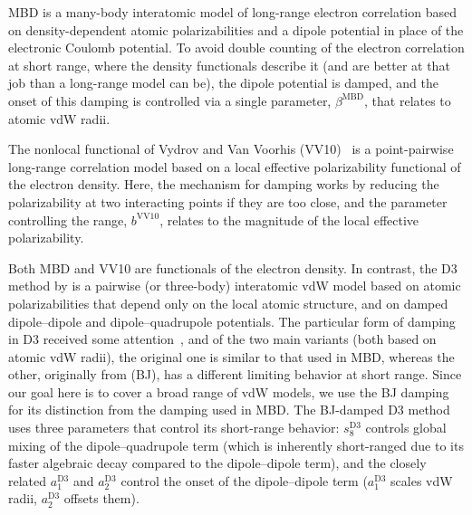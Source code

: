 MBD is a many-body interatomic model of long-range electron correlation based on density-dependent atomic polarizabilities and a dipole potential in place of the electronic Coulomb potential.
To avoid double counting of the electron correlation at short range, where the density functionals describe it (and are better at that job than a long-range model can be), the dipole potential is damped, and the onset of this damping is controlled via a single parameter, $\beta^\text{MBD}$, that relates to atomic vdW radii.

The nonlocal functional of Vydrov and Van Voorhis (VV10)~\cite{VydrovJCP10a} is a point-pairwise long-range correlation model based on a local effective polarizability functional of the electron density.
Here, the mechanism for damping works by reducing the polarizability at two interacting points if they are too close, and the parameter controlling the range, $b^\text{VV10}$, relates to the magnitude of the local effective polarizability.

Both MBD and VV10 are functionals of the electron density.
In contrast, the D3 method by \citet{GrimmeJCP10} is a pairwise (or three-body) interatomic vdW model based on atomic polarizabilities that depend only on the local atomic structure, and on damped dipole--dipole and dipole--quadrupole potentials.
The particular form of damping in D3 received some attention~\cite{GrimmeJCC11,SchroderJCTC15,SmithJPCL16,WitteJCTC17}, and of the two main variants (both based on atomic vdW radii), the original one is similar to that used in MBD, whereas the other, originally from \citet{JohnsonJCP06} (BJ), has a different limiting behavior at short range.
Since our goal here is to cover a broad range of vdW models, we use the BJ damping for its distinction from the damping used in MBD\@.
The BJ-damped D3 method uses three parameters that control its short-range behavior: $s_8^\text{D3}$ controls global mixing of the dipole--quadrupole term (which is inherently short-ranged due to its faster algebraic decay compared to the dipole--dipole term), and the closely related $a_1^\text{D3}$ and $a_2^\text{D3}$ control the onset of the dipole--dipole term ($a_1^\text{D3}$ scales vdW radii, $a_2^\text{D3}$ offsets them).

